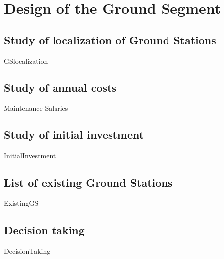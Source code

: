 \chapter{Design of the Ground Segment}

\section{Study of localization of Ground Stations}
{GSlocalization}

\section{Study of annual costs}
{Maintenance}
{Salaries}

\section{Study of initial investment}
{InitialInvestment}

\section{List of existing Ground Stations}
{ExistingGS}

\section{Decision taking}
{DecisionTaking}

%
%
